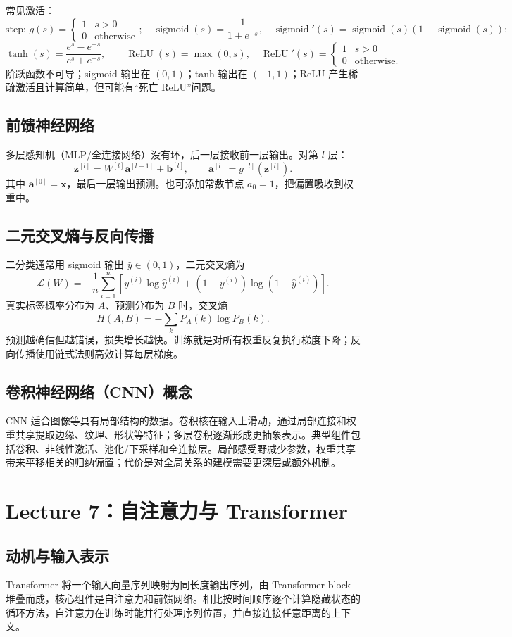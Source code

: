 \documentclass[UTF8,11pt,a4paper]{ctexart}
\newcommand{\loss}{\mathcal{L}}\newcommand{\softmax}{\operatorname{softmax}}\newcommand{\sigmoid}{\operatorname{sigmoid}}
\begin{document}
常见激活：\[
\text{step: }g(s)=\begin{cases}1&s>0\\0&\text{otherwise}\end{cases};\quad
\sigmoid(s)=\frac1{1+e^{-s}},\quad \sigmoid'(s)=\sigmoid(s)(1-\sigmoid(s));
\]
\[
\tanh(s)=\frac{e^s-e^{-s}}{e^s+e^{-s}},\qquad
\operatorname{ReLU}(s)=\max(0,s),\quad
\operatorname{ReLU}'(s)=\begin{cases}1&s>0\\0&\text{otherwise.}\end{cases}
\]
阶跃函数不可导；sigmoid 输出在 $(0,1)$；tanh 输出在 $(-1,1)$；ReLU 产生稀疏激活且计算简单，但可能有“死亡 ReLU”问题。

\subsection{前馈神经网络}
多层感知机（MLP/全连接网络）没有环，后一层接收前一层输出。对第 $l$ 层：
\[
\bm z^{[l]}=W^{[l]}\bm a^{[l-1]}+\bm b^{[l]},\qquad
\bm a^{[l]}=g^{[l]}(\bm z^{[l]}).
\]
其中 $\bm a^{[0]}=\bm x$，最后一层输出预测。也可添加常数节点 $a_0=1$，把偏置吸收到权重中。

\subsection{二元交叉熵与反向传播}
二分类通常用 sigmoid 输出 $\hat y\in(0,1)$，二元交叉熵为
\[
\loss(W)=-\frac1n\sum_{i=1}^{n}\left[y^{(i)}\log \hat y^{(i)}+(1-y^{(i)})\log(1-\hat y^{(i)})\right].
\]
真实标签概率分布为 $A$、预测分布为 $B$ 时，交叉熵
\[
H(A,B)=-\sum_kP_A(k)\log P_B(k).
\]
预测越确信但越错误，损失增长越快。训练就是对所有权重反复执行梯度下降；反向传播使用链式法则高效计算每层梯度。

\subsection{卷积神经网络（CNN）概念}
CNN 适合图像等具有局部结构的数据。卷积核在输入上滑动，通过局部连接和权重共享提取边缘、纹理、形状等特征；多层卷积逐渐形成更抽象表示。典型组件包括卷积、非线性激活、池化/下采样和全连接层。局部感受野减少参数，权重共享带来平移相关的归纳偏置；代价是对全局关系的建模需要更深层或额外机制。

\section{Lecture 7：自注意力与 Transformer}
\subsection{动机与输入表示}
Transformer 将一个输入向量序列映射为同长度输出序列，由 Transformer block 堆叠而成，核心组件是自注意力和前馈网络。相比按时间顺序逐个计算隐藏状态的循环方法，自注意力在训练时能并行处理序列位置，并直接连接任意距离的上下文。
\end{document}
